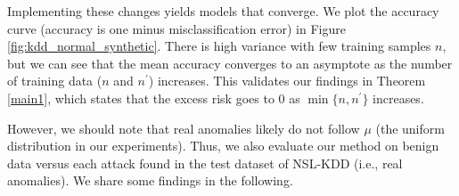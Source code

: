\documentclass{article}
\begin{document}
Implementing these changes yields models that converge.
We plot the accuracy curve (accuracy is one minus misclassification error) in Figure \ref{fig:kdd_normal_synthetic}. 
There is high variance with few training samples $n$, but we can see that the mean accuracy converges to an asymptote as the number of training data ($n$ and $n^\prime$) increases. 
This validates our findings in Theorem \ref{main1}, which states that the excess risk goes to $0$ as $\min\{n, n^\prime\}$ increases. 




However, we should note that real anomalies likely do not follow $\mu$ (the uniform distribution in our experiments).
Thus, we also evaluate our method on benign data versus each attack found in the test dataset of NSL-KDD (i.e., real anomalies). We share some findings in the following. 



\end{document}
